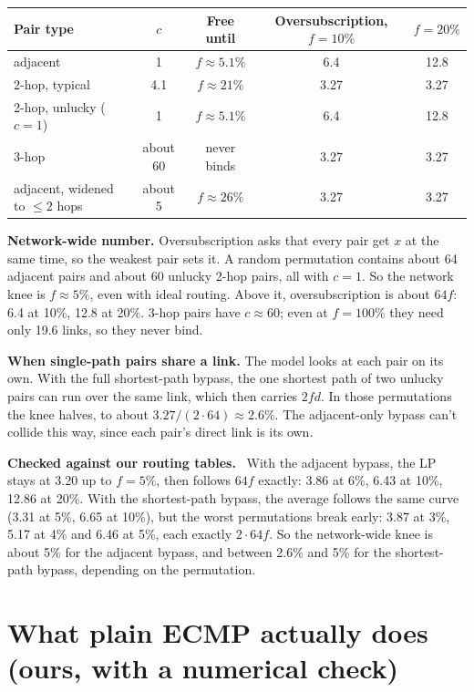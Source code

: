 \documentclass[11pt]{article}
\newenvironment{checked}
  {\par\smallskip\noindent\begin{lrbox}{\checkedbox}%
   \begin{minipage}{\dimexpr\linewidth-2\fboxsep\relax}%
   \textbf{Checked against our routing tables.}\ }
  {\end{minipage}\end{lrbox}\colorbox{black!5}{\usebox{\checkedbox}}\par\smallskip}
\begin{document}
\begin{center}
\begin{tabular}{@{}lcccc@{}}
\toprule
Pair type & $c$ & Free until & Oversubscription, $f = 10\%$ & $f = 20\%$ \\
\midrule
adjacent & 1 & $f \approx 5.1\%$ & 6.4 & 12.8 \\
2-hop, typical & 4.1 & $f \approx 21\%$ & 3.27 & 3.27 \\
2-hop, unlucky ($c = 1$) & 1 & $f \approx 5.1\%$ & 6.4 & 12.8 \\
3-hop & about 60 & never binds & 3.27 & 3.27 \\
adjacent, widened to $\le 2$ hops & about 5 & $f \approx 26\%$ & 3.27 & 3.27 \\
\bottomrule
\end{tabular}
\end{center}

\textbf{Network-wide number.} Oversubscription asks that every pair get $x$ at the same time, so the weakest pair sets it. A random permutation contains about 64 adjacent pairs and about 60 unlucky 2-hop pairs, all with $c = 1$. So the network knee is $f \approx 5\%$, even with ideal routing. Above it, oversubscription is about $64 f$: 6.4 at 10\%, 12.8 at 20\%. 3-hop pairs have $c \approx 60$; even at $f = 100\%$ they need only 19.6 links, so they never bind.

\textbf{When single-path pairs share a link.} The model looks at each pair on its own. With the full shortest-path bypass, the one shortest path of two unlucky pairs can run over the same link, which then carries $2 f d$. In those permutations the knee halves, to about $3.27 / (2 \cdot 64) \approx 2.6\%$. The adjacent-only bypass can't collide this way, since each pair's direct link is its own.

\begin{checked}
With the adjacent bypass, the LP stays at 3.20 up to $f = 5\%$, then follows $64 f$ exactly: 3.86 at 6\%, 6.43 at 10\%, 12.86 at 20\%. With the shortest-path bypass, the average follows the same curve (3.31 at 5\%, 6.65 at 10\%), but the worst permutations break early: 3.87 at 3\%, 5.17 at 4\% and 6.46 at 5\%, each exactly $2 \cdot 64 f$. So the network-wide knee is about 5\% for the adjacent bypass, and between 2.6\% and 5\% for the shortest-path bypass, depending on the permutation.
\end{checked}

\section{What plain ECMP actually does (ours, with a numerical check)}
\end{document}
